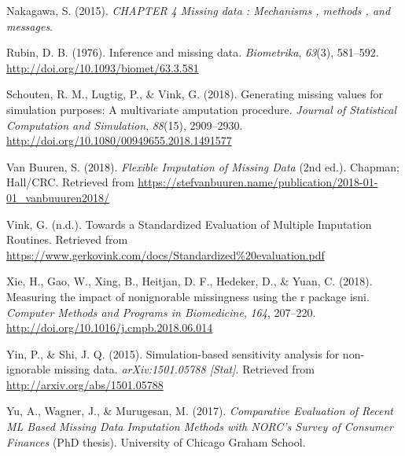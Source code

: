 \documentclass[12pt,oneside]{chicagocapstone}
\begin{document}
\hypertarget{ref-nakagawa_chapter_2015}{}
Nakagawa, S. (2015). \emph{CHAPTER 4 Missing data : Mechanisms , methods
, and messages}.

\hypertarget{ref-rubin_inference_1976}{}
Rubin, D. B. (1976). Inference and missing data. \emph{Biometrika},
\emph{63}(3), 581--592. \url{http://doi.org/10.1093/biomet/63.3.581}

\hypertarget{ref-schouten_generating_2018}{}
Schouten, R. M., Lugtig, P., \& Vink, G. (2018). Generating missing
values for simulation purposes: A multivariate amputation procedure.
\emph{Journal of Statistical Computation and Simulation}, \emph{88}(15),
2909--2930. \url{http://doi.org/10.1080/00949655.2018.1491577}

\hypertarget{ref-van_buuren_flexible_2018}{}
Van Buuren, S. (2018). \emph{Flexible Imputation of Missing Data} (2nd
ed.). Chapman; Hall/CRC. Retrieved from
\url{https://stefvanbuuren.name/publication/2018-01-01_vanbuuuren2018/}

\hypertarget{ref-vink_towards_nodate}{}
Vink, G. (n.d.). Towards a Standardized Evaluation of Multiple
Imputation Routines. Retrieved from
\url{https://www.gerkovink.com/docs/Standardized\%20evaluation.pdf}

\hypertarget{ref-xie_measuring_2018}{}
Xie, H., Gao, W., Xing, B., Heitjan, D. F., Hedeker, D., \& Yuan, C.
(2018). Measuring the impact of nonignorable missingness using the r
package isni. \emph{Computer Methods and Programs in Biomedicine},
\emph{164}, 207--220. \url{http://doi.org/10.1016/j.cmpb.2018.06.014}

\hypertarget{ref-yin_simulation_based_2015}{}
Yin, P., \& Shi, J. Q. (2015). Simulation-based sensitivity analysis for
non-ignorable missing data. \emph{arXiv:1501.05788 {[}Stat{]}}.
Retrieved from \url{http://arxiv.org/abs/1501.05788}

\hypertarget{ref-yu_comparative_2017}{}
Yu, A., Wagner, J., \& Murugesan, M. (2017). \emph{Comparative
Evaluation of Recent ML Based Missing Data Imputation Methods with
NORC's Survey of Consumer Finances} (PhD thesis). University of Chicago
Graham School.


\end{document}
